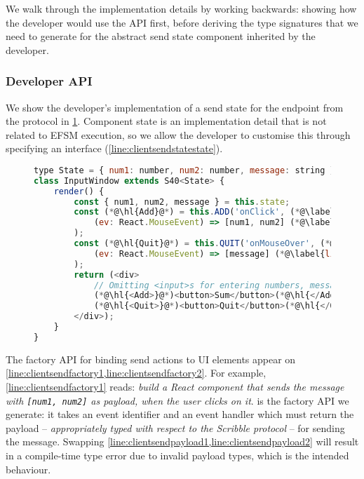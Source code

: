 We walk through the implementation details by working backwards:
showing how the developer would use the API first,
before deriving the type signatures that we need to
generate for the abstract send state component inherited by the developer.

\subsubsection{Developer API}

We show the developer's implementation 
of a send state for the  endpoint
from the  protocol in \cref{lst:adderclientsenddev}.
Component state is an implementation detail 
that is not related to EFSM execution, so we allow
the developer to customise this through specifying an 
interface (\cref{line:clientsendstatestate}).

\begin{figure}[!h]
\begin{lstlisting}[language=javascript,tabsize=2]
type State = { num1: number, num2: number, message: string }; (*@\label{line:clientsendstatestate}@*)
class InputWindow extends S40<State> {
	render() {
		const { num1, num2, message } = this.state;
		const (*@\hl{Add}@*) = this.ADD('onClick', (*@\label{line:clientsendfactory1}@*)
			(ev: React.MouseEvent) => [num1, num2] (*@\label{line:clientsendpayload1}@*)
		);
		const (*@\hl{Quit}@*) = this.QUIT('onMouseOver', (*@\label{line:clientsendfactory2}@*)
			(ev: React.MouseEvent) => [message] (*@\label{line:clientsendpayload2}@*)
		);		
		return (<div>
			// Omitting <input>s for entering numbers, message
			(*@\hl{<Add>}@*)<button>Sum</button>(*@\hl{</Add>}@*)
			(*@\hl{<Quit>}@*)<button>Quit</button>(*@\hl{</Quit>}@*)
		</div>);
	}
}
\end{lstlisting}
\label{lst:adderclientsenddev}
\end{figure}

The factory API for binding send actions to UI elements appear on
\cref{line:clientsendfactory1,line:clientsendfactory2}.
For example, \cref{line:clientsendfactory1} reads: 
\textit{build a React component that sends the 
message with \texttt{[num1, num2]} as payload,
when the user clicks on it}.
 is the factory API we generate: it takes an event identifier
and an event handler which must return the payload 
-- \textit{appropriately typed with respect to the Scribble protocol} -- 
for sending the  message.
Swapping \cref{line:clientsendpayload1,line:clientsendpayload2}
will result in a compile-time type error due to invalid 
payload types, which is the intended behaviour.

